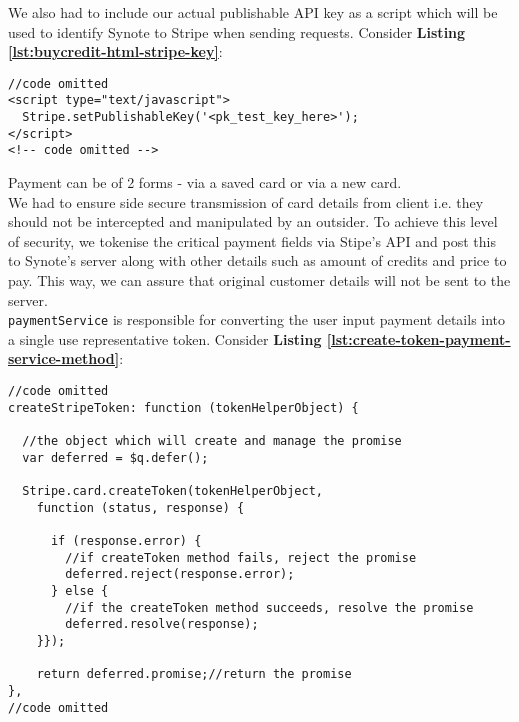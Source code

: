 We also had to include our actual publishable API key as a script which will be used to identify Synote to Stripe when sending requests. Consider \textbf{Listing \ref{lst:buycredit-html-stripe-key}}:\\

\begin{listing}[H]
\begin{verbatim}
//code omitted
<script type="text/javascript">
  Stripe.setPublishableKey('<pk_test_key_here>');
</script>
<!-- code omitted -->
\end{verbatim}
\label{lst:buycredit-html-stripe-key}
\end{listing}

Payment can be of 2 forms - via a saved card or via a new card.\\

We had to ensure side secure transmission of card details from client i.e. they should not be intercepted and manipulated by an outsider. To achieve this level of security, we tokenise the critical payment fields via Stipe’s API and post this to Synote’s server along with other details such as amount of credits and price to pay. This way, we can assure that original customer details will not be sent to the server.\\

\texttt{paymentService} is responsible for converting the user input payment details into a single use representative token.  Consider \textbf{Listing \ref{lst:create-token-payment-service-method}}:\\

\begin{listing}[H]
\begin{verbatim}
//code omitted
createStripeToken: function (tokenHelperObject) {

  //the object which will create and manage the promise
  var deferred = $q.defer();

  Stripe.card.createToken(tokenHelperObject,
    function (status, response) {

      if (response.error) {
        //if createToken method fails, reject the promise
        deferred.reject(response.error);
      } else {
        //if the createToken method succeeds, resolve the promise
        deferred.resolve(response);
    }});

    return deferred.promise;//return the promise
},
//code omitted
\end{verbatim}
\label{lst:create-token-payment-service-method}
\end{listing}

